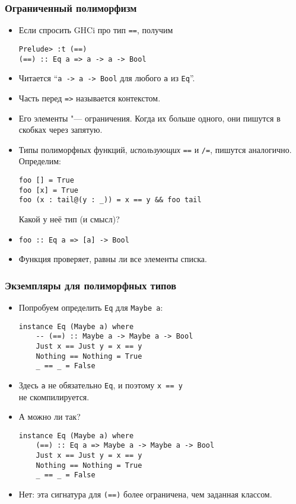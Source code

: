 \documentclass[10pt]{beamer}
\begin{document}
\begin{frame}[fragile]
\frametitle{Ограниченный полиморфизм}
\begin{itemize}
    \item Если спросить GHCi про тип \lstinline|==|, получим
\begin{lstlisting}[basicstyle=\ttfamily\small]
Prelude> :t (==)
(==) :: Eq a => a -> a -> Bool
\end{lstlisting}
    \item Читается \enquote{\lstinline|a -> a -> Bool| для любого \lstinline|a| из \lstinline|Eq|}.
    \item Часть перед \lstinline|=>| называется контекстом. 
    \item Его элементы "--- ограничения. Когда их больше одного, они пишутся в скобках через запятую.\pause
    \item Типы полиморфных функций, \emph{использующих} \lstinline|==| и \lstinline|/=|, пишутся аналогично. Определим:
\begin{lstlisting}[basicstyle=\ttfamily\small]
foo [] = True
foo [x] = True
foo (x : tail@(y : _)) = x == y && foo tail
\end{lstlisting}
    Какой у неё тип (и смысл)? \pause
    \item \lstinline[basicstyle=\ttfamily\small]|foo :: Eq a => [a] -> Bool| \pause
    \item Функция проверяет, равны ли все элементы списка.
\end{itemize}
\end{frame}

\begin{frame}[fragile]
\frametitle{Экземпляры для полиморфных типов}
\begin{itemize}
    \item Попробуем определить \lstinline|Eq| для \lstinline|Maybe a|:\pause
\begin{lstlisting}[basicstyle=\ttfamily\small]
instance Eq (Maybe a) where
    -- (==) :: Maybe a -> Maybe a -> Bool
    Just x == Just y = x == y
    Nothing == Nothing = True
    _ == _ = False
\end{lstlisting}
     \pause
    \item Здесь \lstinline|a| не обязательно \lstinline|Eq|, и поэтому \lstinline|x == y| \\не скомпилируется.
    \item А можно ли так?
\begin{lstlisting}[basicstyle=\ttfamily\small]
instance Eq (Maybe a) where
    (==) :: Eq a => Maybe a -> Maybe a -> Bool
    Just x == Just y = x == y
    Nothing == Nothing = True
    _ == _ = False
\end{lstlisting} \pause
    \item Нет: эта сигнатура для \lstinline|(==)| более ограничена, чем заданная классом.
\end{itemize}
\end{frame}
\end{document}

